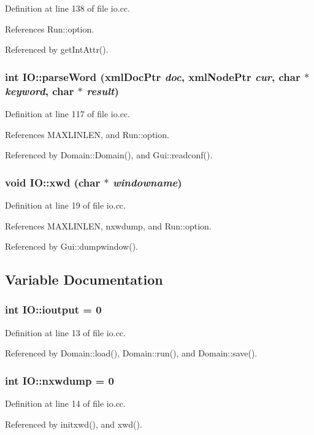 Definition at line 138 of file io.cc.

References Run::option.

Referenced by getIntAttr().\hypertarget{namespaceIO_300fd8cb58ab398ac9ad83ce857b874e}{
\subsubsection[{parseWord}]{\setlength{\rightskip}{0pt plus 5cm}int IO::parseWord (xmlDocPtr {\em doc}, \/  xmlNodePtr {\em cur}, \/  char $\ast$ {\em keyword}, \/  char $\ast$ {\em result})}}
\label{namespaceIO_300fd8cb58ab398ac9ad83ce857b874e}




Definition at line 117 of file io.cc.

References MAXLINLEN, and Run::option.

Referenced by Domain::Domain(), and Gui::readconf().\hypertarget{namespaceIO_86c41e7ac36635653e7ebf4b72df9801}{
\subsubsection[{xwd}]{\setlength{\rightskip}{0pt plus 5cm}void IO::xwd (char $\ast$ {\em windowname})}}
\label{namespaceIO_86c41e7ac36635653e7ebf4b72df9801}




Definition at line 19 of file io.cc.

References MAXLINLEN, nxwdump, and Run::option.

Referenced by Gui::dumpwindow().

\subsection{Variable Documentation}
\hypertarget{namespaceIO_01c166ef9176fbdc6b1f96de7ca861a4}{
\subsubsection[{ioutput}]{\setlength{\rightskip}{0pt plus 5cm}int {\bf IO::ioutput} = 0}}
\label{namespaceIO_01c166ef9176fbdc6b1f96de7ca861a4}




Definition at line 13 of file io.cc.

Referenced by Domain::load(), Domain::run(), and Domain::save().\hypertarget{namespaceIO_ab2504f45fec1bcec679af841fa5065c}{
\subsubsection[{nxwdump}]{\setlength{\rightskip}{0pt plus 5cm}int {\bf IO::nxwdump} = 0}}
\label{namespaceIO_ab2504f45fec1bcec679af841fa5065c}




Definition at line 14 of file io.cc.

Referenced by initxwd(), and xwd().